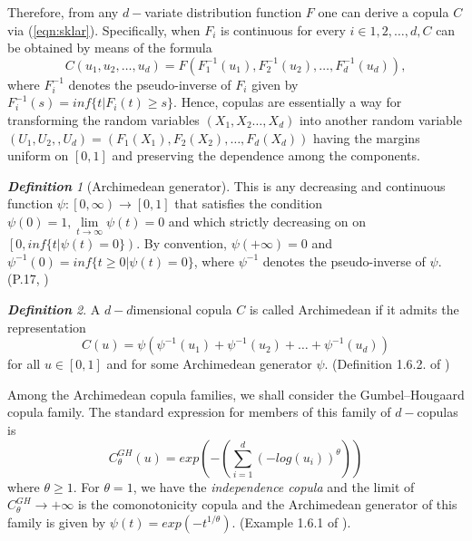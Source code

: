 \documentclass[12pt,oneside,a4paper]{book}
\theoremstyle{definition}
\theoremstyle{remark}
\newtheorem{defn}{\bf Definition}[subsection]
\begin{document}
				Therefore, from any $d-$variate distribution function $F$ one can derive a copula $C$ via (\ref{eqn:sklar}). Specifically, when $F_i$ is continuous for every $i \in {1,2, \dots ,d}, C$ can be obtained by means of the formula
					\begin{equation}\label{eqn:invcopula}
						C(u_1,u_2, \dots ,u_d) = F(F^{-1}_1 (u_1),F^{-1}_2 (u_2), \dots,F^{-1}_d (u_d)),
					\end{equation}
				where $F^{-1}_i$ denotes the pseudo-inverse of $F_i$ given by $F^{-1}_i (s) = inf\{t | F_i(t)\ge s\}$.
				Hence, copulas are essentially a way for transforming the random variables $(X_1,X_2 \dots,X_d)$ into another random variable $(U_1,U_2, ,U_d) = (F_1(X_1),F_2(X_2), \dots,F_d(X_d))$ having the margins uniform on $[0,1]$ and preserving the dependence among the components. \cite{jaworski2010copula}

				\begin{defn}[Archimedean generator]
					This is any decreasing and continuous function $\psi : \left[0,\infty\right) \rightarrow [0,1]$ that satisfies the condition $\psi(0)=1, \lim\limits_{t \rightarrow \infty}\psi(t) =0$ and which strictly decreasing on on $\left[ 0, inf\{t | \psi(t)=0\}\right)$. By convention, $\psi(+\infty) = 0$ and $\psi^{-1}(0) = inf\{t \ge 0 | \psi(t) = 0\}$, where $\psi^{-1}$ denotes the pseudo-inverse of $\psi$.(P.17, \cite{jaworski2010copula})
				\end{defn}

				\begin{defn}
					A $d-d$imensional copula $C$ is called Archimedean if it admits the representation
					\begin{equation}\label{eqn:archmediancop}
						C(u) =\psi (\psi^{-1}(u_1) +\psi^{-1}(u_2)+ \dots + \psi^{-1}(u_d))
					\end{equation}
					for all $u \in [0,1]$ and for some Archimedean generator $\psi$. (Definition 1.6.2. of \cite{jaworski2010copula})
				\end{defn}

				Among the Archimedean copula families, we shall consider the Gumbel–Hougaard copula family. The standard expression for members of this family of $d-$copulas is
				\begin{equation}\label{eqn:gumbelHougaard}
					C^{GH}_{\theta}(u) = exp\left(-\left(\sum_{i=1}^{d} (-log(u_i))^{\theta}\right)\right)
				\end{equation}
				where $\theta \ge1$. For $\theta = 1$, we have the \textit{independence copula} and the limit of $C^{GH}_{\theta} \rightarrow +\infty$ is the comonotonicity copula and the Archimedean generator of this family is given by $\psi(t) = exp\left(-t^{1/{\theta}}\right)$. (Example 1.6.1 of \cite{jaworski2010copula}).
\end{document}
